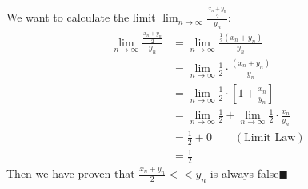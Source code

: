 \documentclass[12pt]{exam}
\newcommand {\DS} [1] {${\displaystyle #1}$}
\begin{document}
\begin{enumerate}
\begin{enumerate}
		We want to calculate the limit $\lim_{n\to\infty}\frac{\frac{x_n+y_n}{2}}{y_n}$:
		\begin{align*}
		    \lim_{n\to\infty}\frac{\frac{x_n+y_n}{2}}{y_n}&=\lim_{n\to\infty}\frac{\frac{1}{2}(x_n+y_n)}{y_n}\\
		    &=\lim_{n\to\infty}\frac{1}{2}\cdot\frac{(x_n+y_n)}{y_n}\\
		    &=\lim_{n\to\infty}\frac{1}{2}\cdot[1+\frac{x_n}{y_n}]\\
		    &=\lim_{n\to\infty}\frac{1}{2}+\lim_{n\to\infty}\frac{1}{2}\cdot\frac{x_n}{y_n}\\
		    &=\frac{1}{2}+0\qquad(\mbox{Limit Law})\\
		    &=\frac{1}{2}
		\end{align*}
		Then we have proven that \DS{\frac{x_n+y_n}{2} << y_n} is always false\qquad$\blacksquare$
	\end{enumerate}

\end{enumerate}
\end{document}
